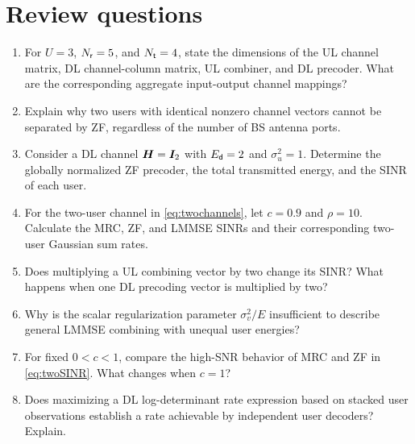 \clearpage\appendix

\section*{Review questions}
\begin{enumerate}[label=\textbf{E\arabic*.}]
	\item For $U=3$, $N_{\mathsf{r}}=5$, and $N_{\mathsf{t}}=4$, state the dimensions of the UL channel matrix, DL channel-column matrix, UL combiner, and DL precoder. What are the corresponding aggregate input-output channel mappings?
	
	\item Explain why two users with identical nonzero channel vectors cannot be separated by ZF, regardless of the number of BS antenna ports.
	
	\item Consider a DL channel $\bm{H}=\bm{I}_2$ with $E_{\mathsf{d}}=2$ and $\sigma_u^2=1$. Determine the globally normalized ZF precoder, the total transmitted energy, and the SINR of each user.
	
	\item For the two-user channel in \eqref{eq:twochannels}, let $c=0.9$ and $\rho=10$. Calculate the MRC, ZF, and LMMSE SINRs and their corresponding two-user Gaussian sum rates.
	
	\item Does multiplying a UL combining vector by two change its SINR? What happens when one DL precoding vector is multiplied by two?
	
	\item Why is the scalar regularization parameter $\sigma_v^2/E$ insufficient to describe general LMMSE combining with unequal user energies?
	
	\item For fixed $0<c<1$, compare the high-SNR behavior of MRC and ZF in \eqref{eq:twoSINR}. What changes when $c=1$?
	
	\item Does maximizing a DL log-determinant rate expression based on stacked user observations establish a rate achievable by independent user decoders? Explain.
\end{enumerate}

\clearpage
